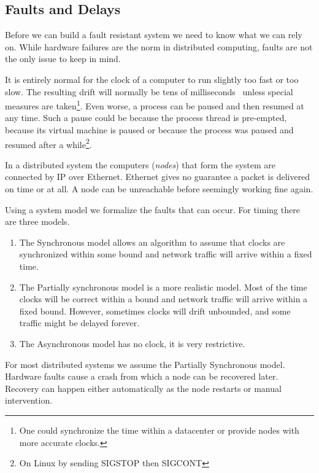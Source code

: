 \subsection{Faults and Delays} \label{sec:faults}
Before we can build a fault resistant system we need to know what we can rely on. While hardware failures are the norm in distributed computing, faults are not the only issue to keep in mind. 

It is entirely normal for the clock of a computer to run slightly too fast or too slow. The resulting drift will normally be tens of milliseconds~\cite{time} unless special measures are taken\footnote{One could synchronize the time within a datacenter or provide nodes with more accurate clocks.}. Even worse, a process can be paused and then resumed at any time. Such a pause could be because the process thread is pre-empted, because its virtual machine is paused or because the process was paused and resumed after a while\footnote{On Linux by sending SIGSTOP then SIGCONT}. 

In a distributed system the computers (\textit{nodes}) that form the system are connected by IP over Ethernet. Ethernet gives no guarantee a packet is delivered on time or at all. A node can be unreachable before seemingly working fine again.

Using a system model we formalize the faults that can occur. For timing there are three models. 
\begin{enumerate}
	\item The Synchronous model allows an algorithm to assume that clocks are synchronized within some bound and network traffic will arrive within a fixed time.
	\item The Partially synchronous model is a more realistic model. Most of the time clocks will be correct within a bound and network traffic will arrive within a fixed bound. However, sometimes clocks will drift unbounded, and some traffic might be delayed forever.
	\item The Asynchronous model has no clock, it is very restrictive.
\end{enumerate}

For most distributed systems we assume the Partially Synchronous model. Hardware faults cause a crash from which a node can be recovered later. Recovery can happen either automatically as the node restarts or manual intervention.
